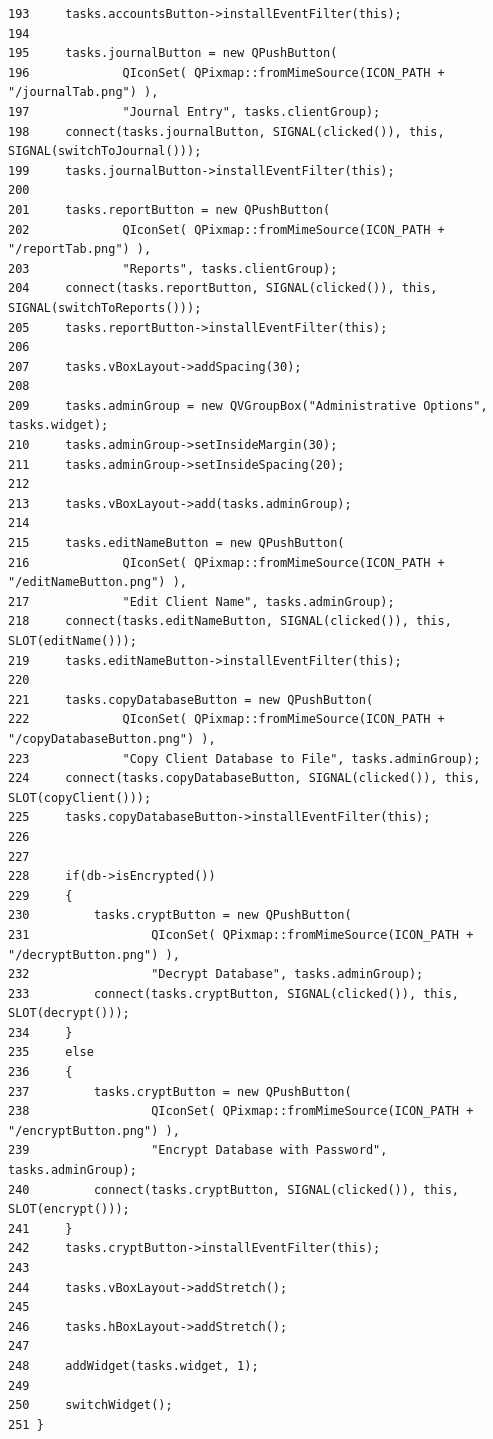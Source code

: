 \begin{verbatim}
193     tasks.accountsButton->installEventFilter(this);
194     
195     tasks.journalButton = new QPushButton(
196             QIconSet( QPixmap::fromMimeSource(ICON_PATH + "/journalTab.png") ),
197             "Journal Entry", tasks.clientGroup);
198     connect(tasks.journalButton, SIGNAL(clicked()), this, SIGNAL(switchToJournal()));
199     tasks.journalButton->installEventFilter(this);
200     
201     tasks.reportButton = new QPushButton(
202             QIconSet( QPixmap::fromMimeSource(ICON_PATH + "/reportTab.png") ),
203             "Reports", tasks.clientGroup);
204     connect(tasks.reportButton, SIGNAL(clicked()), this, SIGNAL(switchToReports()));
205     tasks.reportButton->installEventFilter(this);
206     
207     tasks.vBoxLayout->addSpacing(30);
208     
209     tasks.adminGroup = new QVGroupBox("Administrative Options", tasks.widget);
210     tasks.adminGroup->setInsideMargin(30);
211     tasks.adminGroup->setInsideSpacing(20);
212     
213     tasks.vBoxLayout->add(tasks.adminGroup);
214     
215     tasks.editNameButton = new QPushButton(
216             QIconSet( QPixmap::fromMimeSource(ICON_PATH + "/editNameButton.png") ),
217             "Edit Client Name", tasks.adminGroup);
218     connect(tasks.editNameButton, SIGNAL(clicked()), this, SLOT(editName()));
219     tasks.editNameButton->installEventFilter(this);
220     
221     tasks.copyDatabaseButton = new QPushButton(
222             QIconSet( QPixmap::fromMimeSource(ICON_PATH + "/copyDatabaseButton.png") ),
223             "Copy Client Database to File", tasks.adminGroup);
224     connect(tasks.copyDatabaseButton, SIGNAL(clicked()), this, SLOT(copyClient()));
225     tasks.copyDatabaseButton->installEventFilter(this);
226     
227 
228     if(db->isEncrypted())
229     {
230         tasks.cryptButton = new QPushButton(
231                 QIconSet( QPixmap::fromMimeSource(ICON_PATH + "/decryptButton.png") ),
232                 "Decrypt Database", tasks.adminGroup);
233         connect(tasks.cryptButton, SIGNAL(clicked()), this, SLOT(decrypt()));
234     }
235     else
236     {
237         tasks.cryptButton = new QPushButton(
238                 QIconSet( QPixmap::fromMimeSource(ICON_PATH + "/encryptButton.png") ),
239                 "Encrypt Database with Password", tasks.adminGroup);
240         connect(tasks.cryptButton, SIGNAL(clicked()), this, SLOT(encrypt()));
241     }
242     tasks.cryptButton->installEventFilter(this);
243     
244     tasks.vBoxLayout->addStretch();
245     
246     tasks.hBoxLayout->addStretch();
247     
248     addWidget(tasks.widget, 1);
249         
250     switchWidget();
251 }
\end{verbatim}\normalsize 


